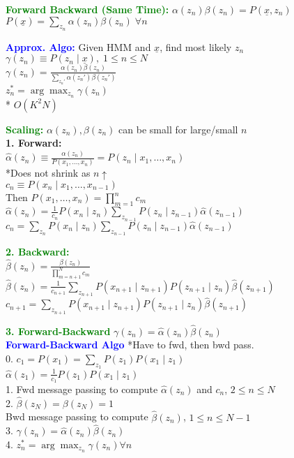 \documentclass[5pt]{extarticle} %
\begin{document}
\begin{paracol}{3}
{    \textcolor{green}{\textbf{Forward Backward (Same Time):}} $\alpha (z_n) \beta(z_n) = P(\underline{x}, z_n)$ \\
    $P(\underline{x}) = \sum_{z_n} \alpha(z_n) \beta(z_n) \; \forall n$ 

    \textcolor{blue}{\textbf{Approx. Algo:}} Given HMM and $\underline{x}$, find most likely $z_n$\\
    $\gamma (z_n) \equiv P(z_n \mid \underline{x}), \; 1 \leq n \leq N$ \\
    $\boxed{\gamma(z_n) = \frac{\alpha(z_n) \beta(z_n)}{\sum_{z_n'} \alpha(z_n') \beta(z_n')}}$ \\
    $\boxed{z_n^* = \arg \max_{z_n} \gamma(z_n)}$ \\
    * $O(K^2 N)$ 

    \textcolor{green}{\textbf{Scaling:}} $\alpha(z_n),\beta(z_n)$ can be small for large/small $n$ \\ 
    \textbf{1. Forward:} \\
    $\hat{\alpha}(z_n) \equiv \frac{\alpha(z_n)}{P(x_1,\ldots,x_n)} = P(z_n \mid x_1,\ldots,x_n)$ \\
    *Does not shrink as $n \uparrow$ \\
    $c_n \equiv P(x_n \mid x_1,\ldots,x_{n-1})$ \\
    Then $P(x_1,\ldots,x_n) = \prod_{m=1}^n c_m$ \\
    $\boxed{\hat{\alpha}(z_n) = \frac{1}{c_n} P(x_n \mid z_n) \sum_{z_{n-1}} P(z_n \mid z_{n-1}) \hat{\alpha}(z_{n-1})}$ \\
    $\boxed{c_n = \sum_{z_n} P(x_n \mid z_n) \sum_{z_{n-1}} P(z_n \mid z_{n-1}) \hat{\alpha}(z_{n-1})}$ 

    \textcolor{green}{\textbf{2. Backward:}} \\
    $\hat{\beta}(z_n) = \frac{\beta(z_n)}{\prod_{m=n+1}^N c_m}$ \\
    $\boxed{\hat{\beta}(z_n) = \frac{1}{c_{n+1}} \sum_{z_{n+1}} P(x_{n+1} \mid z_{n+1}) P(z_{n+1} \mid z_n) \hat{\beta}(z_{n+1})}$ \\
    $\boxed{c_{n+1} = \sum_{z_{n+1}} P(x_{n+1} \mid z_{n+1}) P(z_{n+1} \mid z_n) \hat{\beta}(z_{n+1})}$

    \textcolor{green}{\textbf{3. Forward-Backward}} $\boxed{\gamma (z_n) = \hat{\alpha}(z_n) \hat{\beta}(z_n)}$ \\

    \textcolor{blue}{\textbf{Forward-Backward Algo}} 
    *Have to fwd, then bwd pass. \\
    0. $c_1 = P(x_1) = \sum_{z_1} P(z_1) P(x_1 \mid z_1)$ \\
    $\hat{\alpha}(z_1) = \frac{1}{c_1} P(z_1) P(x_1 \mid z_1) $ \\
    1. Fwd message passing to compute $\hat{\alpha}(z_n)$ and $c_n$, $2 \leq n \leq N$ \\
    2. $\hat{\beta}(z_N) = \beta(z_N) =1$ \\
    Bwd message passing to compute $\hat{\beta}(z_n)$, $1 \leq n \leq N-1$ \\
    3. $\gamma(z_n) = \hat{\alpha}(z_n) \hat{\beta}(z_n)$ \\
    4. $z_n^* = \arg \max_{z_n} \gamma(z_n) \forall n$

}
\end{paracol}
\end{document}
